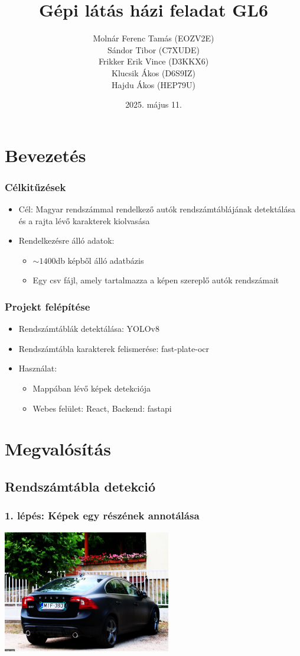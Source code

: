 \documentclass[aspectratio=169]{beamer}
\title{Gépi látás házi feladat GL6}
\author{Molnár Ferenc Tamás (EOZV2E) \\ Sándor Tibor (C7XUDE) \\ Frikker Erik Vince (D3KKX6) \\ Klucsik Ákos (D6S9IZ) \\ Hajdu Ákos (HEP79U)}
\date{2025. május 11.}
\begin{document}
\frame{\titlepage}

\section{Bevezetés}
\begin{frame}
	\frametitle{Célkitűzések}

	\begin{itemize}
		\item Cél: Magyar rendszámmal rendelkező autók rendszámtáblájának
		      detektálása és a rajta lévő karakterek kiolvasása
		\item Rendelkezésre álló adatok:
		      \begin{itemize}
			      \item $\sim 1400$db képből álló adatbázis
			      \item Egy csv fájl, amely tartalmazza a képen szereplő autók
			            rendszámait
		      \end{itemize}
	\end{itemize}
\end{frame}

\begin{frame}
	\frametitle{Projekt felépítése}

	\begin{itemize}
		\item Rendszámtáblák detektálása: YOLOv8
		\item Rendszámtábla karakterek felismerése: fast-plate-ocr
		\item Használat:
		      \begin{itemize}
			      \item Mappában lévő képek detekciója
			      \item Webes felület: React, Backend: fastapi
		      \end{itemize}
	\end{itemize}
\end{frame}

\section{Megvalósítás}
\subsection{Rendszámtábla detekció}
\begin{frame}
	\frametitle{1. lépés: Képek egy részének annotálása}

	\centering
	\includegraphics[width=0.55\textwidth]{images/01_manual.png}
\end{frame}
\end{document}
